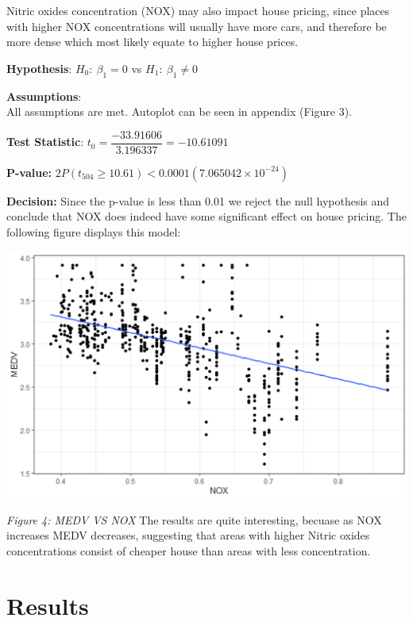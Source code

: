 \documentclass[a4paper,9pt,twocolumn,twoside,]{pinp}
\begin{document}
Nitric oxides concentration (NOX) may also impact house pricing, since
places with higher NOX concentrations will usually have more cars, and
therefore be more dense which most likely equate to higher house prices.
\newline

\textbf{Hypothesis}: \(H_0\colon\ \beta_1 = 0\) vs
\(H_1\colon\ \beta_1 \neq 0\) \newline

\textbf{Assumptions}:\\
All assumptions are met. Autoplot can be seen in appendix (Figure 3).
\newline

\textbf{Test Statistic}:
\(t_0 = \dfrac{-33.91606}{3.196337} = -10.61091\) \newline

\textbf{P-value: }
\(2P(t_{504 }\ge 10.61) < 0.0001 (7.065042\times10^{-24})\) \newline

\textbf{Decision: } Since the p-value is less than 0.01 we reject the
null hypothesis and conclude that NOX does indeed have some significant
effect on house pricing. The following figure displays this model:

\begin{center}\includegraphics[width=0.95\linewidth]{nox_graph} \end{center}

\emph{Figure 4: MEDV VS NOX} \newline \newline The results are quite
interesting, becuase as NOX increases MEDV decreases, suggesting that
areas with higher Nitric oxides concentrations consist of cheaper house
than areas with less concentration.

\hypertarget{results}{%
\section{Results}\label{results}}
\end{document}
